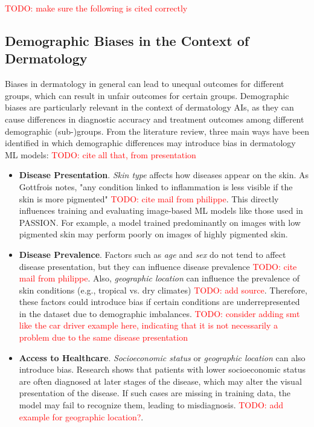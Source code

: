 \documentclass[12pt, a4paper, oneside]{book}   	%
\renewcommand{\todo}[1]{\textcolor{red}{TODO: #1}}
\begin{document}
		  	\todo{make sure the following is cited correctly}
			
			\subsection{Demographic Biases in the Context of Dermatology}
			Biases in dermatology in general can lead to unequal outcomes for different groups, which can result in unfair outcomes for certain groups. Demographic biases are particularly relevant in the context of dermatology \glspl{AI}, as they can cause differences in diagnostic accuracy and treatment outcomes among different demographic (sub-)groups.
			From the literature review, three main ways have been identified in which demographic differences may introduce bias in dermatology \gls{ML} models:
			\todo{cite all that, from presentation}
			
			\begin{itemize}
				\item \textbf{Disease Presentation}. \textit{Skin type} affects how diseases appear on the skin. As Gottfrois notes, "any condition linked to inflammation is less visible if the skin is more pigmented" \todo{cite mail from philippe}. This directly influences training and evaluating image-based \gls{ML} models like those used in PASSION. For example, a model trained predominantly on images with low pigmented skin may perform poorly on images of highly pigmented skin.
				
				\item \textbf{Disease Prevalence}. Factors such as \textit{age} and \textit{sex} do not tend to affect disease presentation, but they can influence disease prevalence \todo{cite mail from philippe}. Also, \textit{geographic location} can influence the prevalence of skin conditions (e.g., tropical vs. dry climates) \todo{add source}. Therefore, these factors could introduce bias if certain conditions are underrepresented in the dataset due to demographic imbalances. \todo{consider adding smt like the car driver example here, indicating that it is not necessarily a problem due to the same disease presentation}
				
				\item \textbf{Access to Healthcare}. \textit{Socioeconomic status} or \textit{geographic location} can also introduce bias. Research shows that patients with lower socioeconomic status are often diagnosed at later stages of the disease, which may alter the visual presentation of the disease. If such cases are missing in training data, the model may fail to recognize them, leading to misdiagnosis. \todo{add example for geographic location?}.
			\end{itemize}
			
\end{document}
